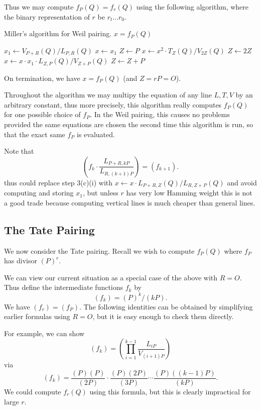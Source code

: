 Thus we may compute $f_P(Q) = f_r(Q)$ using the following algorithm,
where the binary representation of $r$ be $r_t ... r_0$.

\begin{algorithm}
\caption{Miller's algorithm for Weil pairing. $x = f_P(Q)$}
\begin{algorithmic}[1]
\STATE $x_1 \gets V_{P+R}(Q) / L_{P,R}(Q)$
\STATE $x \gets x_1$
\STATE $Z \gets P$
    \STATE $x \gets x^2 \cdot T_Z(Q) / V_{2Z}(Q)$
    \STATE $Z \gets 2Z$
	\STATE $x \gets x \cdot x_1 \cdot L_{Z, P}(Q) / V_{Z+P}(Q)$
	\STATE $Z \gets Z + P$
    \ENDIF
\ENDFOR
\end{algorithmic}
\end{algorithm}

On termination, we have $x = f_P(Q)$ (and $Z = rP = O$).

Throughout the algorithm we may multipy the equation of any line $L, T, V$
by an arbitrary constant, thus more precisely, this algorithm
really computes $f_P(Q)$ for one possible choice of $f_P$.
In the Weil pairing,
this causes no problems provided the same equations are chosen the second
time this algorithm is run, so that the exact same $f_P$ is evaluated.

Note that
\[
\left(
f_k \cdot \frac{L_{P+R,kP}}{L_{R,(k+1)P}}
\right) = (f_{k+1}) .
\]
thus could replace step 3(c)(i) with
$x \gets x \cdot L_{P+R, Z}(Q) / L_{R,Z+P}(Q)$
and avoid computing and storing $x_1$, but unless
$r$ has very low Hamming weight this is not a good trade
because computing vertical lines is much cheaper than general lines.

\subsection {The Tate Pairing}

We now consider the Tate pairing. Recall we wish to compute
$f_P(Q)$ where $f_P$ has divisor $(P)^r$.

We can view our current situation as a special case of the above
with $R = O$.
Thus define the intermediate functions $f_k$ by
\[ (f_k) = (P)^k / (kP) . \]
We have $(f_r) = (f_P)$.
The following identities can be obtained by simplifying
earlier formulas using $R=O$, but it is easy enough to check them directly.

For example, we can show
\[ (f_k) = \left(\prod_{i=1}^{k-1} \frac{L_{iP}}{V_{(i+1)P}}\right) \]
via
\[ (f_k) =
\frac{(P)(P)}{(2P)}
\cdot
\frac{(P)(2P)}{(3P)}
\cdots
\frac{(P)((k-1)P)}{(kP)} .
\]
We could compute $f_r(Q)$ using this formula,
but this is clearly impractical for large $r$.

